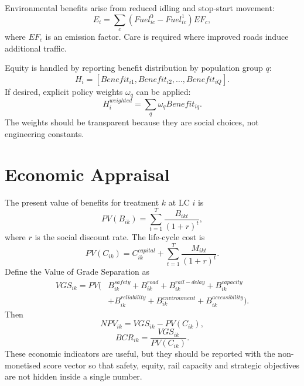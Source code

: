 \documentclass[11pt,a4paper]{article}
\begin{document}
Environmental benefits arise from reduced idling and stop-start movement:
\begin{equation}
E_i=\sum_c \left(Fuel_{ic}^0-Fuel_{ic}^1\right)EF_c,
\end{equation}
where $EF_c$ is an emission factor. Care is required where improved roads induce additional traffic.

Equity is handled by reporting benefit distribution by population group $q$:
\begin{equation}
H_i=\left[Benefit_{i1},Benefit_{i2},\ldots,Benefit_{iQ}\right].
\end{equation}
If desired, explicit policy weights $\omega_q$ can be applied:
\begin{equation}
H_i^{weighted}=\sum_q \omega_q Benefit_{iq}.
\end{equation}
The weights should be transparent because they are social choices, not engineering constants.

\section{Economic Appraisal}

The present value of benefits for treatment $k$ at LC $i$ is
\begin{equation}
PV(B_{ik})=\sum_{t=1}^{T}\frac{B_{ikt}}{(1+r)^t},
\end{equation}
where $r$ is the social discount rate. The life-cycle cost is
\begin{equation}
PV(C_{ik})=C_{ik}^{capital}+\sum_{t=1}^{T}\frac{M_{ikt}}{(1+r)^t}.
\end{equation}
Define the Value of Grade Separation as
\begin{equation}
\begin{split}VGS_{ik}=PV(&B_{ik}^{safety}+B_{ik}^{road}+B_{ik}^{rail-delay}+B_{ik}^{capacity}\\&+B_{ik}^{reliability}+B_{ik}^{environment}+B_{ik}^{accessibility}).\end{split}
\end{equation}
Then
\begin{equation}
NPV_{ik}=VGS_{ik}-PV(C_{ik}),
\end{equation}
\begin{equation}
BCR_{ik}=\frac{VGS_{ik}}{PV(C_{ik})}.
\end{equation}
These economic indicators are useful, but they should be reported with the non-monetised score vector so that safety, equity, rail capacity and strategic objectives are not hidden inside a single number.
\end{document}
